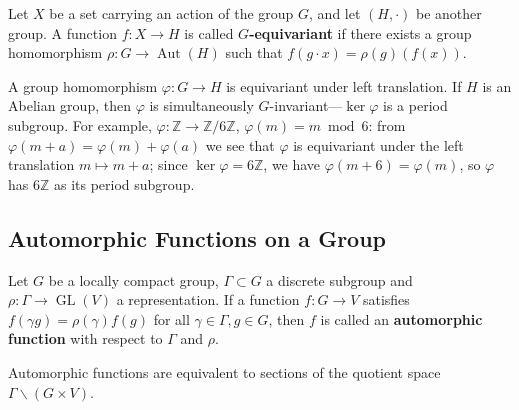 \begin{definition}\label{def:group_valued_function}
Let $X$ be a set carrying an action of the group $G$, and let $(H,\cdot)$ be another group. A function $f: X \to H$ is called \textbf{$G$-equivariant} if there exists a group homomorphism $\rho: G \to \operatorname{Aut}(H)$ such that $f(g \cdot x) = \rho(g)(f(x))$.
\end{definition}

\begin{example}\label{ex:homomorphism_equivariant}
A group homomorphism $\varphi: G \to H$ is equivariant under left translation. If $H$ is an Abelian group, then $\varphi$ is simultaneously $G$-invariant---$\ker\varphi$ is a period subgroup. For example, $\varphi:\mathbb{Z}\to\mathbb{Z}/6\mathbb{Z}$, $\varphi(m)=m\bmod 6$: from $\varphi(m+a)=\varphi(m)+\varphi(a)$ we see that $\varphi$ is equivariant under the left translation $m\mapsto m+a$; since $\ker\varphi=6\mathbb{Z}$, we have $\varphi(m+6)=\varphi(m)$, so $\varphi$ has $6\mathbb{Z}$ as its period subgroup.
\end{example}

\subsection{Automorphic Functions on a Group}

\begin{definition}\label{def:automorphic_form}
Let $G$ be a locally compact group, $\Gamma \subset G$ a discrete subgroup and $\rho: \Gamma \to \operatorname{GL}(V)$ a representation. If a function $f: G \to V$ satisfies $f(\gamma g) = \rho(\gamma) f(g)$ for all $\gamma \in \Gamma, g \in G$, then $f$ is called an \textbf{automorphic function} with respect to $\Gamma$ and $\rho$.
\end{definition}

\begin{theorem}\label{thm:automorphic_quotient}
Automorphic functions are equivalent to sections of the quotient space $\Gamma \backslash (G \times V)$.
\end{theorem}

